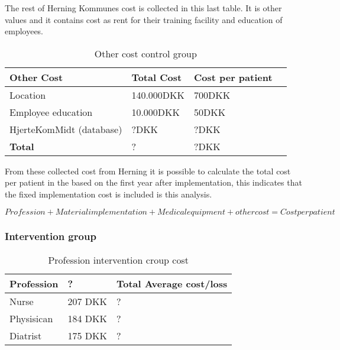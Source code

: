 The rest of Herning Kommunes cost is collected in this last table. It is other values and it contains cost as rent for their training facility and education of employees. 

\begin{table}[H]
\begin{longtabu} to 
    \textbf{Other Cost} &\textbf{Total Cost} & \textbf{Cost per patient} \\[-1ex]
    \midrule
    Location   &  140.000DKK & 700DKK \\ \hline
    Employee education   & 10.000DKK & 50DKK  \\ \hline
    HjerteKomMidt (database)  & ?DKK &   ?DKK \\
    \hline \hline \hline
    \textbf{Total} & ?  & ?DKK
    \newline
    \newline
   \end{longtabu}
\caption{Other cost control group}
\label{tab: OC}
\end{table}

From these collected cost from Herning it is possible to calculate the total cost per patient in the based on the first year after implementation, this indicates that the fixed implementation cost is included is this analysis.

$$Profession + Material implementation + Medical equipment + other cost = Cost per patient$$



\subsubsection{Intervention group}

\begin{table}[H]
\begin{longtabu} to 
    \textbf{Profession} &        \textbf{?} & \textbf{Total Average cost/loss} \\[-1ex]
    \midrule
 	Nurse   &    207 DKK & ? \\ \hline
    Physisican   &   184 DKK    & ? \\ \hline
    Diatrist    &     175 DKK    & ?
    \newline
   \end{longtabu}
\caption{Profession intervention croup cost}
\label{tab: PI}
\end{table}

